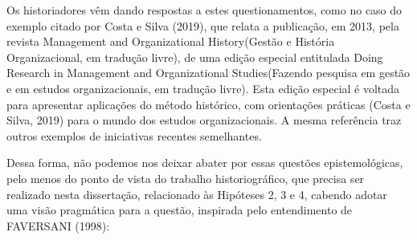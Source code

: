 \documentclass[
12pt,		%
openright,	%
twoside,  %
a4paper,			%
chapter=TITLE,		%
english,			%
french,				%
spanish,			%
brazil				%
]{USPSC-classe/USPSC}
\begin{document}
Os historiadores v\^em dando respostas a estes questionamentos, como no caso do exemplo citado por  Costa e Silva (2019), que relata a publica\c{c}\~ao, em 2013, pela revista \textquotedbl Management and Organizational History\textquotedbl  (\textquotedbl Gest\~ao e Hist\'oria Organizacional\textquotedbl , em tradu\c{c}\~ao livre), de uma edi\c{c}\~ao especial entitulada \textquotedbl Doing Research in Management and Organizational Studies\textquotedbl  (\textquotedbl Fazendo pesquisa em gest\~ao e em estudos organizacionais\textquotedbl , em tradu\c{c}\~ao livre). Esta edi\c{c}\~ao especial \'e voltada para apresentar aplica\c{c}\~oes do m\'etodo hist\'orico, com orienta\c{c}\~oes pr\'aticas  (Costa e Silva, 2019) para o mundo dos estudos organizacionais. A mesma refer\^encia traz outros exemplos de iniciativas recentes semelhantes.








Dessa forma, n\~ao podemos nos deixar abater por essas quest\~oes epistemol\'ogicas, pelo menos do ponto de vista do trabalho historiogr\'afico, que precisa ser realizado nesta disserta\c{c}\~ao, relacionado \`as Hip\'oteses 2, 3 e 4, cabendo adotar uma vis\~ao pragm\'atica para a quest\~ao, inspirada pelo entendimento de FAVERSANI (1998):









\noindent\begin{center}\mbox{\centering{}}\end{center}
\end{document}
